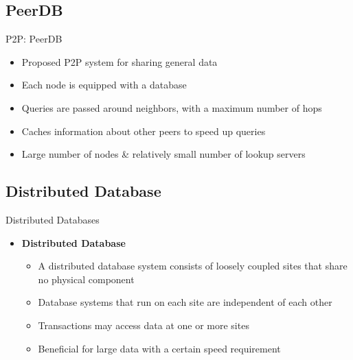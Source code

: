 \documentclass{beamer}
\begin{document}
    
    \subsection{PeerDB}
    \begin{frame}{P2P: PeerDB}
        \begin{itemize}
            \item Proposed P2P system for sharing general data
            \item Each node is equipped with a database
            \item Queries are passed around neighbors, with a maximum number of hops
            \item Caches information about other peers to speed up queries
            \item Large number of nodes \& relatively small number of lookup servers
            \cite{peerdb}
        \end{itemize}
    \end{frame}
    
    \subsection{Distributed Database}
    \begin{frame}{Distributed Databases}
        \begin{itemize}
            \item \textbf{Distributed Database}
            \begin{itemize}
                \item A distributed database system consists of loosely coupled sites that share no physical component             
                \item Database systems that run on each site are independent of each other
                \item Transactions may access data at one or more sites
                \cite[Ch.~19]{Silberschatz2010}
                \item Beneficial for large data with a certain speed requirement
            \end{itemize}
        \end{itemize}
    \end{frame}
\end{document}
